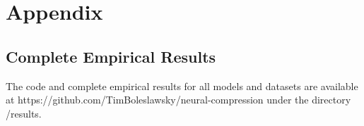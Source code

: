 \chapter{Appendix}

\section*{Complete Empirical Results}
\label{app:empirical-results}

The code and complete empirical results for all models and datasets are available at https://github.com/TimBoleslawsky/neural-compression under the directory /results.